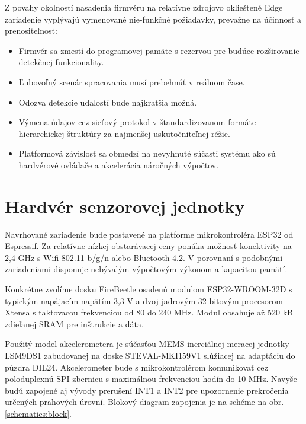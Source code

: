 Z povahy okolností nasadenia firmvéru na relatívne zdrojovo oklieštené Edge zariadenie vyplývajú 
vymenované nie-funkčné požiadavky, prevažne na účinnosť a prenositeľnosť:
\begin{itemize}[noitemsep,topsep=0pt]
\item Firmvér sa zmestí do programovej pamäte s rezervou pre budúce rozširovanie detekčnej funkcionality. 
\item Ľubovoľný scenár spracovania musí prebehnúť v reálnom čase.
\item Odozva detekcie udalostí bude najkratšia možná.
\item Výmena údajov cez sieťový protokol v štandardizovanom formáte hierarchickej štruktúry za najmenšej uskutočniteľnej réžie.
\item Platformová závislosť sa obmedzí na nevyhnuté súčasti systému ako sú hardvérové ovládače a akcelerácia náročných výpočtov.
\end{itemize}

\section{Hardvér senzorovej jednotky}
Navrhované zariadenie bude postavené na platforme mikrokontroléra ESP32 od Espressif. Za relatívne nízkej obstarávacej ceny
ponúka možnosť konektivity na 2,4 GHz s Wifi 802.11 b/g/n alebo Bluetooth 4.2. V porovnaní s podobnými zariadeniami disponuje 
nebývalým výpočtovým výkonom a kapacitou pamätí.

Konkrétne zvolíme dosku FireBeetle osadenú modulom ESP32-WROOM-32D s typickým napájacím napätím 3,3 V a dvoj-jadrovým 
32-bitovým procesorom Xtensa s taktovacou frekvenciou od 80 do 240 MHz. Modul obsahuje až 520 kB zdieľanej SRAM 
pre inštrukcie a dáta. 

Použitý model akcelerometera je súčasťou MEMS inerciálnej meracej jednotky LSM9DS1 zabudovanej na doske
STEVAL-MKI159V1 slúžiacej na adaptáciu do púzdra DIL24. Akcelerometer bude s mikrokontrolérom komunikovať cez
poloduplexnú SPI zbernicu s maximálnou frekvenciou hodín do 10 MHz. Navyše budú zapojené aj vývody prerušení INT1 a INT2
pre upozornenie prekročenia určených prahových úrovní. Blokový diagram zapojenia je na schéme na obr. \ref{schematics:block}.

